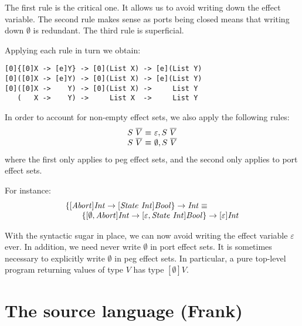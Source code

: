 \documentclass[preprint]{sigplanconf}
\makeatletter
\newcommand{\many}{\overline}
\newcommand\ba{\begin{array}}
\newcommand\ea{\end{array}}
\newcommand{\bstack}{\begin{array}[t]{@{}l@{}}}
\newcommand{\estack}{\end{array}}
\newenvironment{equations}{\[\ba{@{}r@{~}c@{~}l@{}}}{\ea\]}
\newcommand{\effbox}[1]{[#1]}
\newcommand{\thunk}[1]{\{{#1}\}}
\makeatother
\begin{document}
The first rule is the critical one. It allows us to avoid writing down
the effect variable. The second rule makes sense as ports being closed
means that writing down $\emptyset$ is redundant. The third rule is
superficial.

Applying each rule in turn we obtain:
\begin{verbatim}
[0]{[0]X -> [e]Y} -> [0](List X) -> [e](List Y)
[0]([0]X -> [e]Y) -> [0](List X) -> [e](List Y)
[0]([0]X ->    Y) -> [0](List X) ->     List Y 
   (   X ->    Y) ->     List X  ->     List Y 
\end{verbatim}

In order to account for non-empty effect sets, we also apply the
following rules:
\begin{equations}
S~\many{V} &\equiv& \varepsilon, S~\many{V} \\
S~\many{V} &\equiv& \emptyset, S~\many{V} \\
\end{equations}
where the first only applies to peg effect sets, and the second only
applies to port effect sets.

\newcommand{\var}{\mathit}

For instance:
\[
\bstack
\thunk{\effbox{\var{Abort}}\var{Int} \to \effbox{\var{State}~\var{Int}}\var{Bool}} \to \var{Int}
\equiv \\
  \qquad \thunk{\effbox{\emptyset, \var{Abort}}\var{Int} \to
       \effbox{\varepsilon, \var{State}~\var{Int}}\var{Bool}} \to \effbox{\varepsilon}\var{Int}
\estack
\]

With the syntactic sugar in place, we can now avoid writing the effect
variable $\varepsilon$ ever. In addition, we need never write
$\emptyset$ in port effect sets. It is sometimes necessary to
explicitly write $\emptyset$ in peg effect sets. In particular, a pure
top-level program returning values of type $V$ has type
$\effbox{\emptyset}V$.





\section{The source language (Frank)}
\label{sec:frank}
\end{document}
